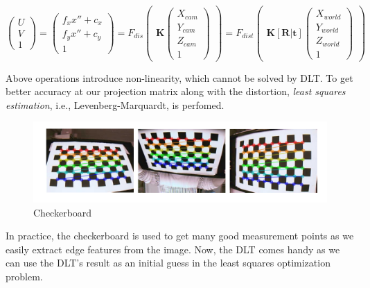 \documentclass[a4paper]{report}
\numberwithin{figure}{section}
\begin{document}
\begin{equation}
  \begin{pmatrix}
    U\\
    V\\
    1
  \end{pmatrix}
  =
  \begin{pmatrix}
    f_x x'' + c_x\\
    f_y x'' + c_y\\
    1
  \end{pmatrix}
    =
    F_{dis}\begin{pmatrix}
      \mathbf{K}
      \begin{pmatrix}
        X_{cam}\\
        Y_{cam}\\
        Z_{cam}\\
        1
      \end{pmatrix}
    \end{pmatrix} 
    =
    F_{dist}\begin{pmatrix}
      \mathbf{K} [\mathbf{R}|\mathbf{t}]
      \begin{pmatrix}
        X_{world}\\
        Y_{world}\\
        Z_{world}\\
        1
      \end{pmatrix}
    \end{pmatrix}
\end{equation} \label{eq:proj_func_w_f_c}

Above operations introduce non-linearity, which cannot be solved by DLT.
To get better accuracy at our projection matrix along with the distortion, 
\textit{least squares estimation}, i.e., Levenberg-Marquardt, is perfomed.

\begin{figure}[H]
	\centering
  \includegraphics[width=\linewidth,natwidth=640,natheight=640]
  {fig/ref_imgs/checkerboard.png}
  \caption{Checkerboard}
  \label{fig:checkerboard}
\end{figure}

In practice, the checkerboard is used to get many good measurement points 
as  we easily extract edge features from the image. Now, the DLT comes handy
as we can use the DLT's result as an initial guess 
in the least squares optimization problem.
\end{document}
